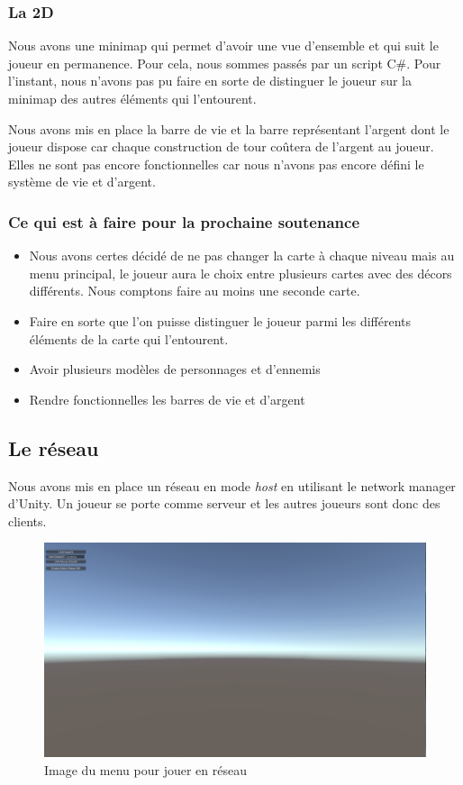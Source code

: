\documentclass[a4paper, 12pt]{article}
\begin{document}
		\subsubsection{La 2D}
Nous avons une minimap qui permet d’avoir une vue d’ensemble et qui suit le joueur en permanence. Pour cela, nous sommes passés par un script C\#.  Pour l’instant, nous n’avons pas pu faire en sorte de distinguer le joueur sur la minimap des autres éléments qui l’entourent.
\par Nous avons mis en place la barre de vie et la barre représentant l'argent dont le joueur dispose car chaque construction de tour coûtera de l’argent au joueur. Elles ne sont pas encore fonctionnelles car nous n’avons pas encore défini le système de vie et d'argent.
\subsubsection*{Ce qui est à faire pour la prochaine soutenance}
\begin{itemize}
\item Nous avons certes décidé de ne pas changer la carte à chaque niveau mais au menu principal, le joueur aura le choix entre plusieurs cartes avec des décors différents. Nous comptons faire au moins une seconde carte.
\item Faire en sorte que l'on puisse distinguer le joueur parmi les différents éléments de la carte qui l’entourent.
\item Avoir plusieurs modèles de personnages et d'ennemis
\item Rendre fonctionnelles les barres de vie et d’argent

\end{itemize}

\newpage

	\subsection{Le réseau}
Nous avons mis en place un réseau en mode \emph{host} en utilisant le network manager d’Unity. Un joueur se porte comme serveur et les autres joueurs sont donc des clients.\\


\begin{figure}[!ht]
	\centerline{\includegraphics[scale=0.3]{Menureseauprojet.png}}
	\caption*{Image du menu pour jouer en réseau}
\end{figure}
\end{document}
